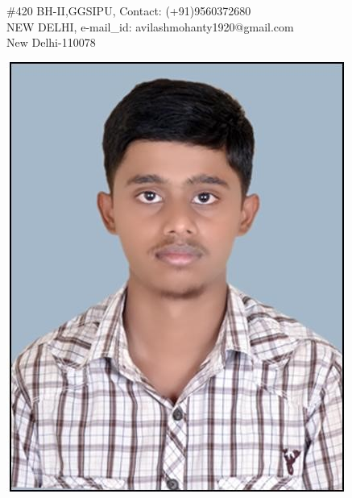 \documentclass[11pt]{article}
\begin{document}

\begin{flushleft}
$\#$420 BH-II,GGSIPU, 
\hfill{Contact: (+91)9560372680}\\
NEW DELHI, 
\hfill{e-mail\_id: avilashmohanty1920@gmail.com}\\
New Delhi-110078

\end{flushleft}

\begin{flushright}
\includegraphics [scale=0.25]{picture.jpg}
\end{flushright}

	
\end{document}
